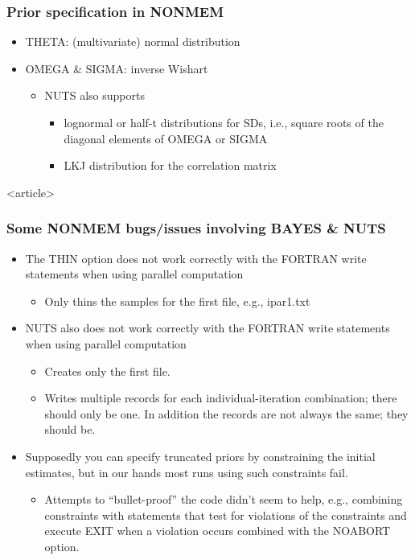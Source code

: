 \documentclass[handout]{beamer}
\begin{document}
\begin{frame}
  \frametitle{Prior specification in NONMEM}
  
  \begin{itemize}
  \item THETA: (multivariate) normal distribution
  \item OMEGA \& SIGMA: inverse Wishart
    \begin{itemize}
    \item NUTS also supports
      \begin{itemize}
      \item lognormal or half-t distributions for SDs, i.e., square
        roots of the diagonal elements of OMEGA or SIGMA
      \item LKJ distribution for the correlation matrix
      \end{itemize}
    \end{itemize}
    \end{itemize}

  \end{frame}

  \begin{frame}<article>
    \frametitle{Some NONMEM bugs/issues involving BAYES \& NUTS}

    \begin{itemize}
    \item The THIN option does not work correctly with the FORTRAN
      write statements when using parallel computation
      \begin{itemize}
      \item Only thins the samples for the first file, e.g., ipar1.txt
      \end{itemize}
    \item NUTS also does not work correctly with the FORTRAN write
      statements when using parallel computation
      \begin{itemize}
      \item Creates only the first file.
      \item Writes multiple records for each individual-iteration
        combination; there should only be one. In addition the records
        are not always the same; they should be.
      \end{itemize}
    \item Supposedly you can specify truncated priors by constraining
      the initial estimates, but in our hands most runs using such
      constraints fail.
      \begin{itemize}
        \item Attempts to ``bullet-proof'' the code didn't seem to help,
        e.g., combining constraints with statements that test for
        violations of the constraints and execute EXIT when a
        violation occurs combined with the NOABORT option.
      \end{itemize}
    \end{itemize}
    
  \end{frame}
\end{document}
